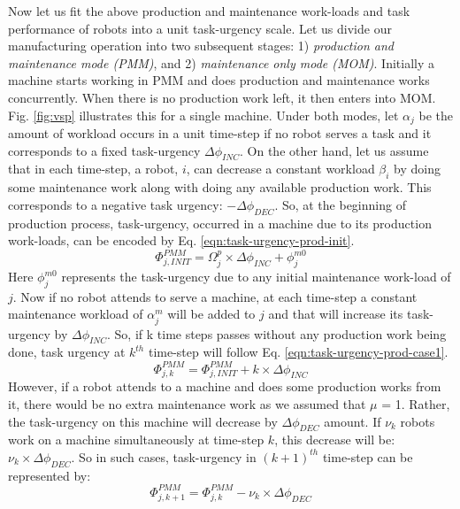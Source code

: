 \documentclass{llncs}
\begin{document}
Now let us fit the above production and maintenance work-loads and task performance of robots into a unit task-urgency scale. Let us divide our manufacturing operation into two subsequent stages: 1) {\em production and maintenance mode (PMM)}, and 2) {\em maintenance only mode (MOM)}. Initially a machine starts working in PMM and does production and maintenance works concurrently. When there is no production work left, it then enters into MOM. Fig. \ref{fig:vsp} illustrates this for a single machine.
Under both modes, let $\alpha_{j}$ be the amount of workload occurs in a unit time-step if no robot serves a task and it corresponds to a fixed task-urgency $\Delta \phi_{INC}$. On the other hand, let us assume that in each time-step, a robot, $i$, can decrease a constant workload $\beta_{i}$ by doing some maintenance work along with doing any available production work. This  corresponds to a negative task urgency: $- \Delta \phi_{DEC}$. 
So, at the beginning of production process, task-urgency, occurred in a machine due to its production work-loads, can be encoded by Eq. \ref{eqn:task-urgency-prod-init}.
\begin{equation}
\Phi_{j, INIT}^{PMM} = \Omega_{j}^{p} \times \Delta \phi_{INC} + \phi_{j}^{m0}
\label{eqn:task-urgency-prod-init}
\end{equation}
Here $\phi_{j}^{m0}$ represents the task-urgency due to any initial maintenance work-load of $j$.
Now if no robot attends to serve a machine, at each time-step a constant maintenance workload of $\alpha_{j}^{m}$ will be added to $j$ and that will increase its task-urgency by $\Delta \phi_{INC}$. So, if k time steps passes without any production work being done, task urgency at $k^{th}$ time-step will follow Eq. \ref{eqn:task-urgency-prod-case1}.
\begin{equation}
\Phi_{j, k}^{PMM} =\Phi_{j, INIT}^{PMM} + k \times \Delta \phi_{INC}
\label{eqn:task-urgency-prod-case1}
\end{equation}
However, if a robot attends to a machine and does some production works from it, there would be no extra maintenance work as we assumed that $\mu$ = 1. Rather, the task-urgency on this machine will decrease by $\Delta \phi_{DEC}$ amount. If $\nu_{k}$ robots work on a machine simultaneously at time-step $k$, this decrease will be: $\nu_{k} \times \Delta \phi_{DEC}$. So in such cases, task-urgency in $(k+1)^{th}$ time-step can be represented by:
\begin{equation}
\Phi_{j, k+1}^{PMM} = \Phi_{j, k}^{PMM} - \nu_{k} \times \Delta \phi_{DEC}
\label{eqn:task-urgency-prod-case2}
\end{equation}
\end{document}
